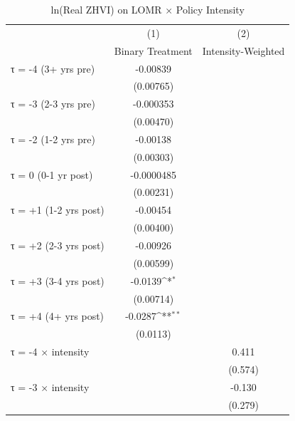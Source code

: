 \begin{table}[htbp]\centering
\def\sym#1{\ifmmode^{#1}\else\(^{#1}\)\fi}
\caption{ln(Real ZHVI) on LOMR × Policy Intensity}
\begin{tabular}{l*{2}{c}}
\hline\hline
                    &\multicolumn{1}{c}{(1)}&\multicolumn{1}{c}{(2)}\\
                    &\multicolumn{1}{c}{Binary Treatment}&\multicolumn{1}{c}{Intensity-Weighted}\\
\hline
τ = -4 (3+ yrs pre) &    -0.00839         &                     \\
                    &   (0.00765)         &                     \\
[1em]
τ = -3 (2-3 yrs pre)&   -0.000353         &                     \\
                    &   (0.00470)         &                     \\
[1em]
τ = -2 (1-2 yrs pre)&    -0.00138         &                     \\
                    &   (0.00303)         &                     \\
[1em]
τ = 0 (0-1 yr post) &  -0.0000485         &                     \\
                    &   (0.00231)         &                     \\
[1em]
τ = +1 (1-2 yrs post)&    -0.00454         &                     \\
                    &   (0.00400)         &                     \\
[1em]
τ = +2 (2-3 yrs post)&    -0.00926         &                     \\
                    &   (0.00599)         &                     \\
[1em]
τ = +3 (3-4 yrs post)&     -0.0139\sym{*}  &                     \\
                    &   (0.00714)         &                     \\
[1em]
τ = +4 (4+ yrs post)&     -0.0287\sym{**} &                     \\
                    &    (0.0113)         &                     \\
[1em]
τ = -4 × intensity  &                     &       0.411         \\
                    &                     &     (0.574)         \\
[1em]
τ = -3 × intensity  &                     &      -0.130         \\
                    &                     &     (0.279)         \\

\end{tabular}
\end{table}
